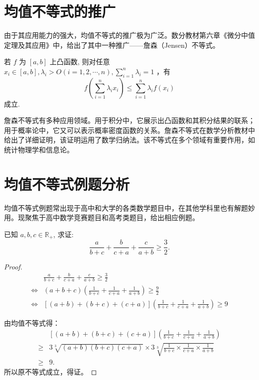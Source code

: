 \section{均值不等式的推广}

由于其应用能力的强大，均值不等式的推广极为广泛。数分教材第六章《微分中值定理及其应用》中，给出了其中一种推广——詹森（Jensen）不等式。

\begin{theorem}
  \parencite{华东师大数学分析}
  若 $f$ 为 $[a, b]$ 上凸函数, 则对任意 $x_{i} \in[a, b], \lambda_{i}>O(i=
1,2, \cdots, n), \sum_{i=1}^{n} \lambda_{i}=1$ ，有 \[ f\left(\sum_{i=1}^{n} \lambda_{i} x_{i}\right) \leq \sum_{i=1}^{n} \lambda_{i} f\left(x_{i}\right)
\]
成立.
\end{theorem}


詹森不等式有多种应用领域。用于积分中，它展示出凸函数和其积分结果的联系；用于概率论中，它又可以表示概率密度函数的关系。詹森不等式在数学分析教材中给出了详细证明，该证明运用了数学归纳法。该不等式在多个领域有重要作用，如统计物理学和信息论。



\section{均值不等式例题分析}

均值不等式例题常出现于高中和大学的各类数学题目中，在其他学科里也有解题妙用。现聚焦于高中数学竞赛题目和高考类题目，给出相应例题。

\begin{example}
  已知 $a, b, c \in \mathbb{R}_{+}$, 求证: \[\frac{a}{b+c}+\frac{b}{c+a}+\frac{c}{a+b} \geq \frac{3}{2}.\]
\end{example}

\begin{proof}
  \begin{align*}
    & \frac{a}{b+c}+\frac{b}{c+a}+\frac{c}{a+b} \geq \frac{3}{2} \\
    \Leftrightarrow  & (a+b+c)\left(\frac{1}{b+c}+\frac{1}{c+a}+\frac{1}{a+b}\right) \geq \frac{9}{2} \\
    \Leftrightarrow  & [(a+b)+(b+c)+(c+a)]\left(\frac{1}{b+c}+\frac{1}{c+a}+\frac{1}{a+b}\right) \geq 9 
  \end{align*}

  由均值不等式得：
  \begin{align*}
    & [(a+b)+(b+c)+(c+a)]\left(\frac{1}{b+c}+\frac{1}{c+a}+\frac{1}{a+b}\right)\\
    \geq & 3 \sqrt[3]{(a+b)(b+c)(c+a)} \times 3 \sqrt[3]{\frac{1}{b+c} \times \frac{1}{c+a} \times \frac{1}{a+b}} \\
    \geq & 9.
  \end{align*}
  所以原不等式成立，得证。
\end{proof}

